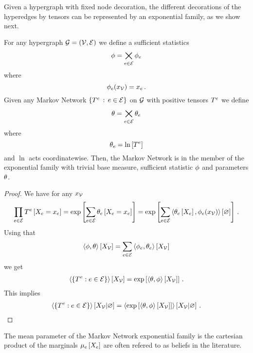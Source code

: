 Given a hypergraph with fixed node decoration, the different decorations of the hyperedges by tensors can be represented by an exponential family, as we show next.

\begin{theorem}
For any hypergraph $\mathcal{G}=(\mathcal{V},\mathcal{E})$ we define a sufficient statistics
\[ \phi = \bigtimes_{e\in\mathcal{E}}  \phi_{e} \]
where
\[ \phi_{e}(x_{\mathcal{V}}) = x_{e} \, . \]
Given any Markov Network $\{T^{e} \, : \, e\in\mathcal{E}\}$ on $\mathcal{G}$ with positive tensors $T^{e}$ we define
\[ \theta = \bigtimes_{e\in\mathcal{E}} \theta_{e} \]
where
\[ \theta_{e} =  \ln \left[ T^{e} \right] \]
and $\ln$ acts coordinatewise.
Then, the Markov Network is in the member of the exponential family with trivial base measure, sufficient statistic $\phi$ and parameters $\theta$.
\end{theorem}
\begin{proof}
We have for any $x_{\mathcal{V}}$
\begin{align}
\prod_{e\in\mathcal{E}} T^{e}\left[X_{e}=x_{e}\right]
= \mathrm{exp}\left[\sum_{e\in\mathcal{E}} \theta_{e}\left[X_{e}=x_{e}\right]\right]
= \mathrm{exp}\left[\sum_{e\in\mathcal{E}} \left\langle \theta_{e}\left[X_{e}\right],\phi_{e}(x_{\mathcal{V}})\right\rangle \left[ \varnothing \right]\right]  \, .
\end{align}
Using that
\[ \left\langle \phi,\theta\right\rangle \left[ X_{\mathcal{V}} \right] = \sum_{e\in\mathcal{E}} \left\langle \phi_{e},\theta_{e}\right\rangle \left[ X_{\mathcal{V}} \right] \]
we get
\begin{align}
\left\langle \{T^{e}: e\in\mathcal{E}\}\right\rangle \left[ X_{\mathcal{V}} \right] = \mathrm{exp}\left[\left\langle \theta,\phi\right\rangle \left[ X_{\mathcal{V}} \right]\right] \, .
\end{align}
This implies
\begin{align}
\left\langle \{T^{e}: e\in\mathcal{E}\}\right\rangle \left[ X_{\mathcal{V}} | \varnothing \right] = \left\langle \mathrm{exp}\left[\left\langle \theta,\phi\right\rangle \left[ X_{\mathcal{V}} \right]\right]\right\rangle \left[ X_{\mathcal{V}} | \varnothing \right] \, .
\end{align}
\end{proof}


The mean parameter of the Markov Network exponential family is the cartesian product of the marginals $\mu_{e}\left[X_{e}\right]$ are often refered to as beliefs in the literature.

